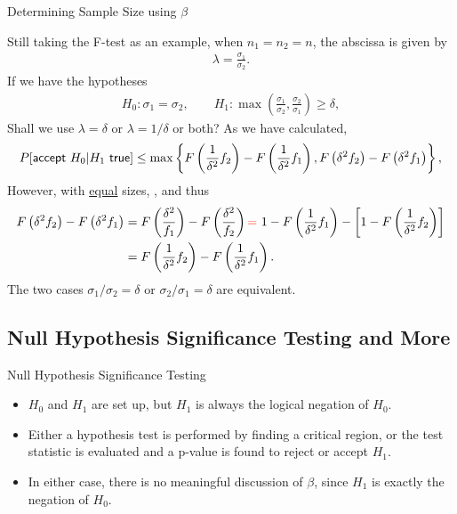 \begin{frame}{Determining Sample Size using $\beta$}

\justifying
{} Still taking the F-test as an example, when $n_1 = n_2 = n$, the abscissa is given by
\footnotesize
\begin{align*}
\lambda = \frac{\sigma_1}{\sigma_2}.
\end{align*}
\normalsize
If we have the hypotheses
\footnotesize
\begin{align*}
H_0: \sigma_1 = \sigma_2,\qquad H_1: \max\left(\frac{\sigma_1}{\sigma_2}, \frac{\sigma_2}{\sigma_1}\right) \geq \delta,
\end{align*}
\normalsize
Shall we use $\lambda = \delta$ or $\lambda = 1/\delta$ or both? \pause As we have calculated,
\footnotesize
\begin{align*}
P[\mathsf{accept\ } H_0|H_1 \mathsf{\ true}] \leq \max\left\{F\left(\frac{1}{\delta^2} f_2 \right) - F\left(\frac{1}{\delta^2} f_1 \right), F\left(\delta^2 f_2 \right) - F\left(\delta^2 f_1 \right) \right\},
\end{align*}
\normalsize
However, with \underline{equal} sizes, , and thus
\footnotesize
\begin{align*}
F\left(\delta^2 f_2 \right) - F\left(\delta^2 f_1 \right) & = F\left(\frac{\delta^2}{f_1}\right) - F\left(\frac{\delta^2}{f_2} \right) \red{=}\ 1 - F\left(\frac{1}{\delta^2}f_1 \right) - \left[1 - F\left(\frac{1}{\delta^2}f_2 \right) \right] \\
& = F\left(\frac{1}{\delta^2} f_2 \right) - F\left(\frac{1}{\delta^2} f_1 \right).
\end{align*}
\normalsize
The two cases $\sigma_1 / \sigma_2 = \delta$ or $\sigma_2 / \sigma_1 = \delta$ are equivalent.


\end{frame}



\subsection{Null Hypothesis Significance Testing and More}

\begin{frame}{Null Hypothesis Significance Testing}

\begin{itemize}
	\justifying
	\item $H_0$ and $H_1$ are set up, but $H_1$ is always the logical negation of $H_0$.
	\item Either a hypothesis test is performed by finding a critical region, or the test statistic is evaluated and a p-value is found to reject or accept $H_1$.
	\item In either case, there is no meaningful discussion of $\beta$, since $H_1$ is exactly the negation of $H_0$.
\end{itemize}

\end{frame}


